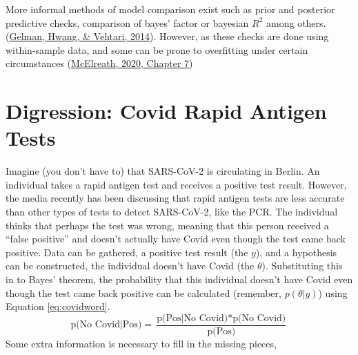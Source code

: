 \documentclass[12pt,twoside]{reedthesis}
\begin{document}
More informal methods of model comparison exist such as prior and posterior predictive checks, comparison of bayes' factor or bayesian \(R^2\) among others. (\protect\hyperlink{ref-gelmanUnderstandingPredictiveInformation2014}{Gelman, Hwang, \& Vehtari, 2014}). However, as these checks are done using within-sample data, and some can be prone to overfitting under certain circumstances (\protect\hyperlink{ref-mcelreathStatisticalRethinkingBayesian2020}{McElreath, 2020, Chapter 7})

\hypertarget{covidex}{%
\section{Digression: Covid Rapid Antigen Tests}\label{covidex}}

Imagine (you don't have to) that SARS-CoV-2 is circulating in Berlin. An individual takes a rapid antigen test and receives a positive test result. However, the media recently has been discussing that rapid antigen tests are less accurate than other types of tests to detect SARS-CoV-2, like the PCR. The individual thinks that perhaps the test was wrong, meaning that this person received a ``false positive'' and doesn't actually have Covid even though the test came back positive. Data can be gathered, a positive test result (the \(y\)), and a hypothesis can be constructed, the individual doesn't have Covid (the \(\theta\)). Substituting this in to Bayes' theorem, the probability that this individual doesn't have Covid even though the test came back positive can be calculated (remember, \(p(\theta|y)\)) using Equation \eqref{eq:covidword}.
\begin{equation}
\text{p(No Covid|Pos)} = \frac{\text{p(Pos|No Covid)} * \text{p(No Covid)}}{\text{p(Pos)}}
\label{eq:covidword}
\end{equation}
Some extra information is necessary to fill in the missing pieces,
\end{document}
